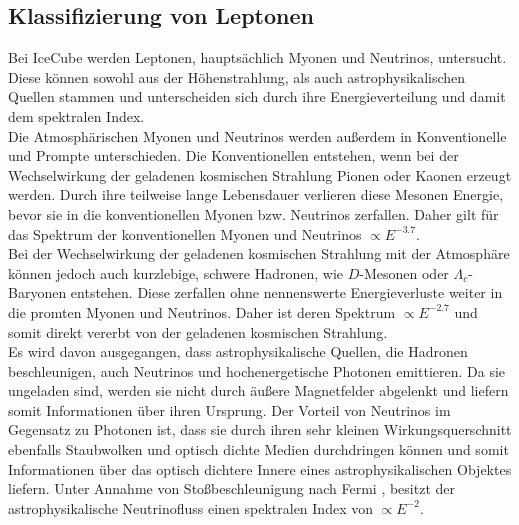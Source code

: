 \subsection{Klassifizierung von Leptonen}
Bei IceCube werden Leptonen, hauptsächlich Myonen und Neutrinos, untersucht. Diese können sowohl aus der Höhenstrahlung, als auch astrophysikalischen Quellen stammen und unterscheiden sich durch ihre Energieverteilung und damit dem spektralen Index. \\
Die Atmosphärischen Myonen und Neutrinos werden außerdem in Konventionelle und Prompte unterschieden. Die Konventionellen entstehen, wenn bei der Wechselwirkung der geladenen kosmischen Strahlung Pionen oder Kaonen erzeugt werden. Durch ihre teilweise lange Lebensdauer verlieren diese Mesonen Energie, bevor sie in die konventionellen Myonen bzw. Neutrinos zerfallen. Daher gilt für das Spektrum der konventionellen Myonen und Neutrinos $\propto E^{-3.7}$.\\
Bei der Wechselwirkung der geladenen kosmischen Strahlung mit der Atmosphäre können jedoch auch kurzlebige, schwere Hadronen, wie $D$-Mesonen oder $\Lambda_{c}$-Baryonen entstehen. Diese zerfallen ohne nennenswerte Energieverluste weiter in die promten Myonen und Neutrinos. Daher ist deren Spektrum  $\propto E^{-2.7}$ und somit direkt vererbt von der geladenen kosmischen Strahlung.\\
Es wird davon ausgegangen, dass astrophysikalische Quellen, die Hadronen beschleunigen, auch Neutrinos und hochenergetische Photonen emittieren. Da sie ungeladen sind, werden sie nicht durch äußere Magnetfelder abgelenkt und liefern somit Informationen über ihren Ursprung. Der Vorteil von Neutrinos im Gegensatz zu Photonen ist, dass sie durch ihren sehr kleinen Wirkungsquerschnitt ebenfalls Staubwolken und optisch dichte Medien durchdringen können und somit Informationen über das optisch dichtere Innere eines astrophysikalischen Objektes liefern. Unter Annahme von Stoßbeschleunigung nach Fermi \cite{PhysRev.75.1169}, besitzt der astrophysikalische Neutrinofluss einen spektralen Index von  $\propto E^{-2}$.\\
